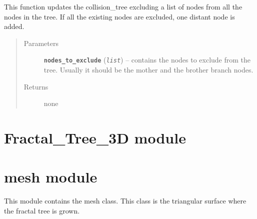 \documentclass[letterpaper,10pt,english]{sphinxmanual}
\begin{document}
\begin{fulllineitems}
\begin{fulllineitems}
\label{Branch3D:Branch3D.Nodes.update_collision_tree}
This function updates the collision\_tree excluding a list of nodes from all the nodes in the tree. If all the existing nodes are excluded, one distant node is added.
\begin{quote}\begin{description}
\item[{Parameters}] \leavevmode
\textbf{\texttt{nodes\_to\_exclude}} (\emph{\texttt{list}}) -- contains the nodes to exclude from the tree. Usually it should be the mother and the brother branch nodes.

\item[{Returns}] \leavevmode
none

\end{description}\end{quote}

\end{fulllineitems}


\end{fulllineitems}



\chapter{Fractal\_Tree\_3D module}
\label{Fractal_Tree_3D:fractal-tree-3d-module}\label{Fractal_Tree_3D::doc}

\chapter{mesh module}
\label{mesh:mesh-module}\label{mesh::doc}\label{mesh:module-mesh}
This module contains the mesh class. This class is the triangular surface where the fractal tree is grown.
\end{document}
